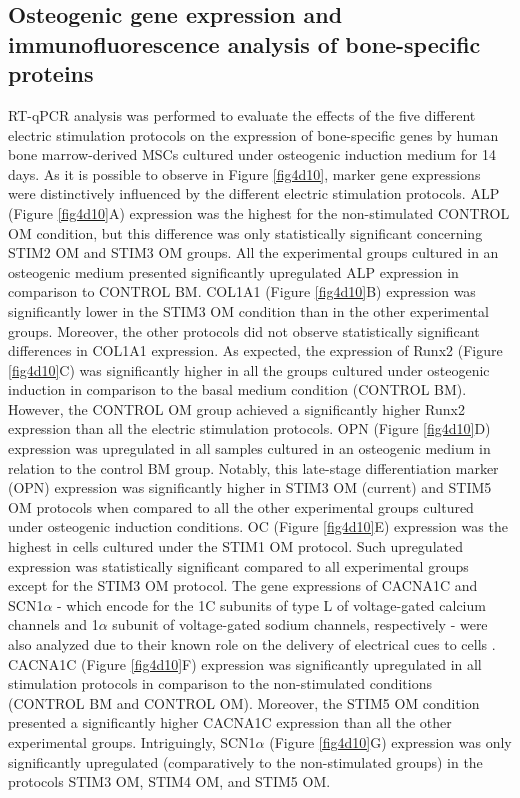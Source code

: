 \subsection{Osteogenic gene expression and immunofluorescence analysis of bone-specific proteins} 
\ac{RT-qPCR} analysis was performed to evaluate the effects of the five different electric stimulation protocols on the expression of bone-specific genes by human bone marrow-derived \ac{MSCs} cultured under osteogenic induction medium for 14 days. As it is possible to observe in Figure \ref{fig4d10}, marker gene expressions were distinctively influenced by the different electric stimulation protocols. ALP (Figure \ref{fig4d10}A) expression was the highest for the non-stimulated CONTROL OM condition, but this difference was only statistically significant concerning STIM2 OM and STIM3 OM groups. All the experimental groups cultured in an osteogenic medium presented significantly upregulated ALP expression in comparison to CONTROL BM. COL1A1 (Figure \ref{fig4d10}B) expression was significantly lower in the STIM3 OM condition than in the other experimental groups. Moreover, the other protocols did not observe statistically significant differences in COL1A1 expression. As expected, the expression of Runx2 (Figure \ref{fig4d10}C) was significantly higher in all the groups cultured under osteogenic induction in comparison to the basal medium condition (CONTROL BM). However, the CONTROL OM group achieved a significantly higher Runx2 expression than all the electric stimulation protocols. OPN (Figure \ref{fig4d10}D) expression was upregulated in all samples cultured in an osteogenic medium in relation to the control BM group. Notably, this late-stage differentiation marker (OPN) expression was significantly higher in STIM3 OM (current) and STIM5 OM protocols when compared to all the other experimental groups cultured under osteogenic induction conditions. OC (Figure \ref{fig4d10}E) expression was the highest in cells cultured under the STIM1 OM protocol. Such upregulated expression was statistically significant compared to all experimental groups except for the STIM3 OM protocol. The gene expressions of CACNA1C and SCN1$\alpha$ - which encode for the 1C subunits of type L of voltage-gated calcium channels and 1$\alpha$ subunit of voltage-gated sodium channels, respectively - were also analyzed due to their known role on the delivery of electrical cues to cells \cite{Li2022-js}. CACNA1C (Figure \ref{fig4d10}F) expression was significantly upregulated in all stimulation protocols in comparison to the non-stimulated conditions (CONTROL BM and CONTROL OM). Moreover, the STIM5 OM condition presented a significantly higher CACNA1C expression than all the other experimental groups. Intriguingly, SCN1$\alpha$ (Figure \ref{fig4d10}G) expression was only significantly upregulated (comparatively to the non-stimulated groups) in the protocols STIM3 OM, STIM4 OM, and STIM5 OM. 

